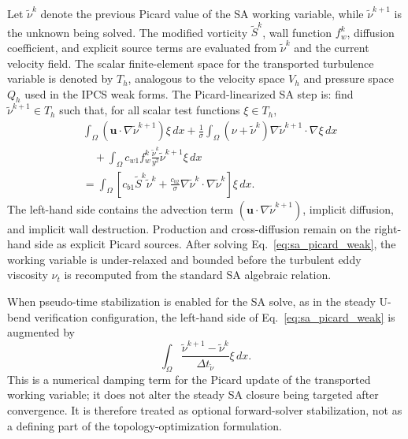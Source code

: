 Let $\tilde{\nu}^{k}$ denote the previous Picard value of the SA working variable, while $\tilde{\nu}^{k+1}$ is the unknown being solved. The modified vorticity $\tilde{S}^{k}$, wall function $f_w^{k}$, diffusion coefficient, and explicit source terms are evaluated from $\tilde{\nu}^{k}$ and the current velocity field. The scalar finite-element space for the transported turbulence variable is denoted by $T_h$, analogous to the velocity space $V_h$ and pressure space $Q_h$ used in the IPCS weak forms. The Picard-linearized SA step is: find $\tilde{\nu}^{k+1}\in T_h$ such that, for all scalar test functions $\xi\in T_h$,
\begin{equation}
	\begin{aligned}
		&\int_\Omega (\mathbf{u}\cdot\nabla\tilde{\nu}^{k+1})\xi\,dx
		+\frac{1}{\sigma}\int_\Omega (\nu+\tilde{\nu}^{k})
		\nabla\tilde{\nu}^{k+1}\cdot\nabla\xi\,dx \\
		&\quad
		+\int_\Omega c_{w1}f_w^{k}\frac{\tilde{\nu}^{k}}{y^2}
		\tilde{\nu}^{k+1}\xi\,dx \\
		&=
		\int_\Omega
		\left[
			c_{b1}\tilde{S}^{k}\tilde{\nu}^{k}
			+\frac{c_{b2}}{\sigma}
			\nabla\tilde{\nu}^{k}\cdot\nabla\tilde{\nu}^{k}
		\right]\xi\,dx .
	\end{aligned}
	\label{eq:sa_picard_weak}
\end{equation}
The left-hand side contains the advection term $(\mathbf{u}\cdot\nabla\tilde{\nu}^{k+1})$, implicit diffusion, and implicit wall destruction. Production and cross-diffusion remain on the right-hand side as explicit Picard sources. After solving Eq.~\ref{eq:sa_picard_weak}, the working variable is under-relaxed and bounded before the turbulent eddy viscosity $\nu_t$ is recomputed from the standard SA algebraic relation.

When pseudo-time stabilization is enabled for the SA solve, as in the steady U-bend verification configuration, the left-hand side of Eq.~\ref{eq:sa_picard_weak} is augmented by
\begin{equation}
	\int_\Omega
	\frac{\tilde{\nu}^{k+1}-\tilde{\nu}^{k}}{\Delta t_{\tilde{\nu}}}
	\xi\,dx .
	\label{eq:sa_pseudo_time}
\end{equation}
This is a numerical damping term for the Picard update of the transported working variable; it does not alter the steady SA closure being targeted after convergence. It is therefore treated as optional forward-solver stabilization, not as a defining part of the topology-optimization formulation.

